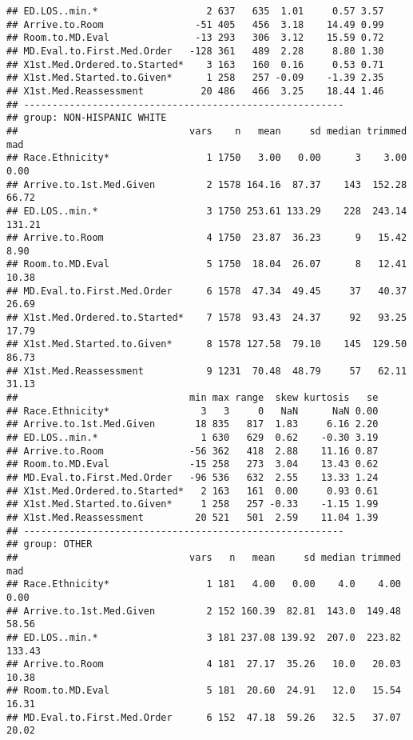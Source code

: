 \documentclass[]{article}
\begin{document}
\begin{verbatim}
## ED.LOS..min.*                   2 637   635  1.01     0.57 3.57
## Arrive.to.Room                -51 405   456  3.18    14.49 0.99
## Room.to.MD.Eval               -13 293   306  3.12    15.59 0.72
## MD.Eval.to.First.Med.Order   -128 361   489  2.28     8.80 1.30
## X1st.Med.Ordered.to.Started*    3 163   160  0.16     0.53 0.71
## X1st.Med.Started.to.Given*      1 258   257 -0.09    -1.39 2.35
## X1st.Med.Reassessment          20 486   466  3.25    18.44 1.46
## -------------------------------------------------------- 
## group: NON-HISPANIC WHITE
##                              vars    n   mean     sd median trimmed    mad
## Race.Ethnicity*                 1 1750   3.00   0.00      3    3.00   0.00
## Arrive.to.1st.Med.Given         2 1578 164.16  87.37    143  152.28  66.72
## ED.LOS..min.*                   3 1750 253.61 133.29    228  243.14 131.21
## Arrive.to.Room                  4 1750  23.87  36.23      9   15.42   8.90
## Room.to.MD.Eval                 5 1750  18.04  26.07      8   12.41  10.38
## MD.Eval.to.First.Med.Order      6 1578  47.34  49.45     37   40.37  26.69
## X1st.Med.Ordered.to.Started*    7 1578  93.43  24.37     92   93.25  17.79
## X1st.Med.Started.to.Given*      8 1578 127.58  79.10    145  129.50  86.73
## X1st.Med.Reassessment           9 1231  70.48  48.79     57   62.11  31.13
##                              min max range  skew kurtosis   se
## Race.Ethnicity*                3   3     0   NaN      NaN 0.00
## Arrive.to.1st.Med.Given       18 835   817  1.83     6.16 2.20
## ED.LOS..min.*                  1 630   629  0.62    -0.30 3.19
## Arrive.to.Room               -56 362   418  2.88    11.16 0.87
## Room.to.MD.Eval              -15 258   273  3.04    13.43 0.62
## MD.Eval.to.First.Med.Order   -96 536   632  2.55    13.33 1.24
## X1st.Med.Ordered.to.Started*   2 163   161  0.00     0.93 0.61
## X1st.Med.Started.to.Given*     1 258   257 -0.33    -1.15 1.99
## X1st.Med.Reassessment         20 521   501  2.59    11.04 1.39
## -------------------------------------------------------- 
## group: OTHER
##                              vars   n   mean     sd median trimmed    mad
## Race.Ethnicity*                 1 181   4.00   0.00    4.0    4.00   0.00
## Arrive.to.1st.Med.Given         2 152 160.39  82.81  143.0  149.48  58.56
## ED.LOS..min.*                   3 181 237.08 139.92  207.0  223.82 133.43
## Arrive.to.Room                  4 181  27.17  35.26   10.0   20.03  10.38
## Room.to.MD.Eval                 5 181  20.60  24.91   12.0   15.54  16.31
## MD.Eval.to.First.Med.Order      6 152  47.18  59.26   32.5   37.07  20.02

\end{verbatim}
\end{document}
